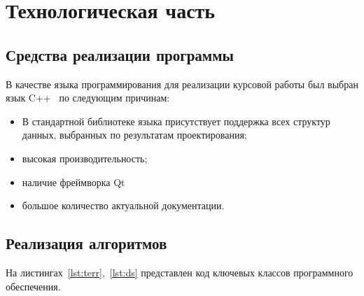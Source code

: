 \chapter{Технологическая часть}

\section{Средства реализации программы}

В качестве языка программирования для реализации курсовой работы был выбран язык C++~\cite{C++} по следующим причинам:

\begin{itemize}
	\item В стандартной библиотеке языка присутствует поддержка всех
	структур данных, выбранных по результатам проектирования;
	\item высокая производительность;
	\item наличие фреймворка Qt~\cite{Qt}
	\item большое количество актуальной документации.
\end{itemize}

\section{Реализация алгоритмов}

На листингах~\ref{lst:terr},~\ref{lst:ds} представлен код ключевых классов программного обеспечения.

